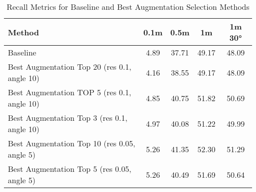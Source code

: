 
\begin{table}[ht]
    \centering
    \begin{tabular}{lcccc}
        \hline
        \textbf{Method} & \textbf{0.1m} & \textbf{0.5m} & \textbf{1m} & \textbf{1m 30°} \\
        \hline
    Baseline & 4.89 & 37.71 & 49.17 & 48.09 \\
    Best Augmentation Top 20 (res 0.1, angle 10) & 4.16 & 38.55 & 49.17 & 48.09 \\
    Best Augmentation TOP 5 (res 0.1, angle 10) & 4.85 & 40.75 & 51.82 & 50.69 \\
    Best Augmentation Top 3 (res 0.1, angle 10) & 4.97 & 40.08 & 51.22 & 49.99 \\
    Best Augmentation Top 10 (res 0.05, angle 5) & 5.26 & 41.35 & 52.30 & 51.29 \\
    Best Augmentation Top 5 (res 0.05, angle 5)  & 5.26 & 40.49 & 51.69 & 50.64 \\
        \hline
    \end{tabular}
    \caption{Recall Metrics for Baseline and Best Augmentation Selection Methods}
    \label{tab:recall_metrics}
\end{table}

